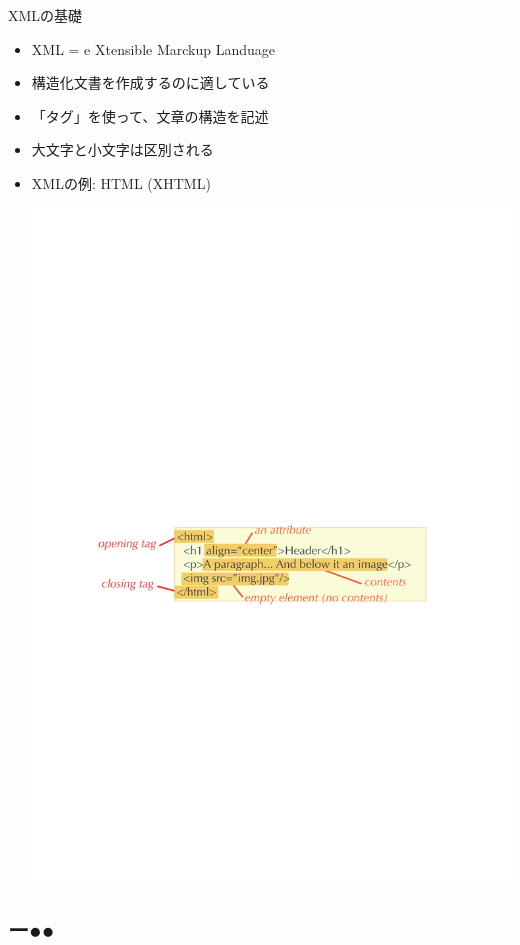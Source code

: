 \begin{frame}{XMLの基礎}
  \begin{itemize}
  \item XML = e{\color{red} X}tensible {\color{red} M}arckup {\color{red} L}anduage
  \item 構造化文書を作成するのに適している
  \item 「タグ」を使って、文章の構造を記述
  \item 大文字と小文字は区別される
  \item XMLの例: HTML (XHTML)
  \begin{center}
    \includegraphics[height=0.3\textheight]{xml1.pdf}
  \end{center}
  \end{itemize}
\end{frame}

\subsection*{{\protect\color{red}ー}{\protect\color{blue}●}{\protect\color{green}●}}

